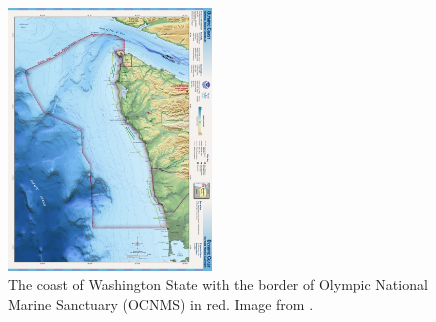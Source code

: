 \documentclass[12pt,twoside]{reedthesis}
\begin{document}
\begin{figure}
	\begin{center}
		\includegraphics[width=0.48\textwidth]{Fig_OCNMS_Map}
		\caption[Map of OCNMS]{\footnotesize{The coast of Washington State with the border of Olympic National Marine Sanctuary (OCNMS) in red. Image from .}} %
		\label{OCNMSMap}
	\end{center}
\end{figure} 
\end{document}
